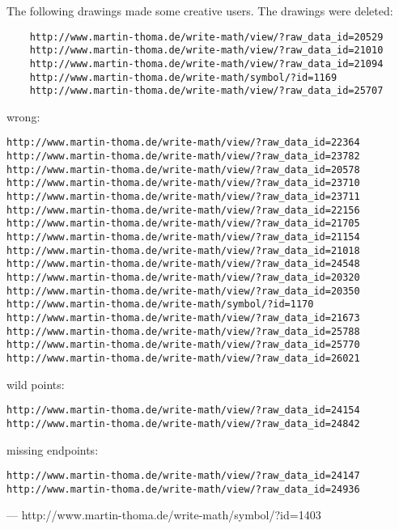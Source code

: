 The following drawings made some creative users. The drawings were deleted:

\begin{verbatim}
    http://www.martin-thoma.de/write-math/view/?raw_data_id=20529
    http://www.martin-thoma.de/write-math/view/?raw_data_id=21010
    http://www.martin-thoma.de/write-math/view/?raw_data_id=21094
    http://www.martin-thoma.de/write-math/symbol/?id=1169
    http://www.martin-thoma.de/write-math/view/?raw_data_id=25707
\end{verbatim}

wrong:
\begin{verbatim}
http://www.martin-thoma.de/write-math/view/?raw_data_id=22364
http://www.martin-thoma.de/write-math/view/?raw_data_id=23782
http://www.martin-thoma.de/write-math/view/?raw_data_id=20578
http://www.martin-thoma.de/write-math/view/?raw_data_id=23710
http://www.martin-thoma.de/write-math/view/?raw_data_id=23711
http://www.martin-thoma.de/write-math/view/?raw_data_id=22156
http://www.martin-thoma.de/write-math/view/?raw_data_id=21705
http://www.martin-thoma.de/write-math/view/?raw_data_id=21154
http://www.martin-thoma.de/write-math/view/?raw_data_id=21018
http://www.martin-thoma.de/write-math/view/?raw_data_id=24548
http://www.martin-thoma.de/write-math/view/?raw_data_id=20320
http://www.martin-thoma.de/write-math/view/?raw_data_id=20350
http://www.martin-thoma.de/write-math/symbol/?id=1170
http://www.martin-thoma.de/write-math/view/?raw_data_id=21673
http://www.martin-thoma.de/write-math/view/?raw_data_id=25788
http://www.martin-thoma.de/write-math/view/?raw_data_id=25770
http://www.martin-thoma.de/write-math/view/?raw_data_id=26021
\end{verbatim}


wild points:
\begin{verbatim}
http://www.martin-thoma.de/write-math/view/?raw_data_id=24154
http://www.martin-thoma.de/write-math/view/?raw_data_id=24842
\end{verbatim}

missing endpoints:
\begin{verbatim}
http://www.martin-thoma.de/write-math/view/?raw_data_id=24147
http://www.martin-thoma.de/write-math/view/?raw_data_id=24936
\end{verbatim}



---
http://www.martin-thoma.de/write-math/symbol/?id=1403